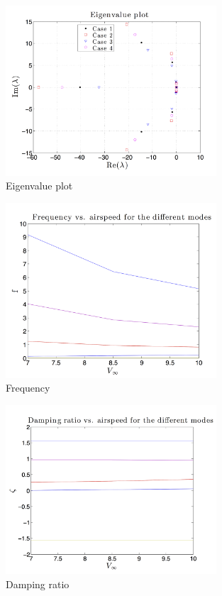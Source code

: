 \documentclass[11pt]{article}
\begin{document}
\begin{figure}[h!]
  \centering
  \includegraphics[width=0.7\textwidth]{Figures/PS2/SkynetV1_eig.png}
  \caption{Eigenvalue plot}\label{fig:eig}
\end{figure}
\begin{figure}[h!]
  \centering
  \includegraphics[width=0.7\textwidth]{Figures/PS2/SkynetV1_freq.png}
  \caption{Frequency}\label{fig:freq}
\end{figure}
\begin{figure}[h!]
  \centering
  \includegraphics[width=0.7\textwidth]{Figures/PS2/SkynetV1_damp.png}
  \caption{Damping ratio}\label{fig:damp}
\end{figure}
\end{document}
